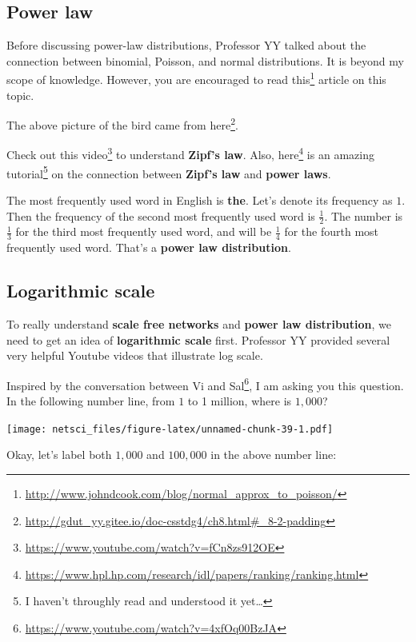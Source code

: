 \documentclass[
]{krantz}
\makeatletter
\renewcommand{\href}[2]{#2\footnote{\url{#1}}}
\newenvironment{kframe}{%
\medskip{}
\setlength{\fboxsep}{.8em}
 \def\at@end@of@kframe{}%
 \ifinner\ifhmode%
  \def\at@end@of@kframe{\end{minipage}}%
  \begin{minipage}{\columnwidth}%
 \fi\fi%
 \def\FrameCommand##1{\hskip\@totalleftmargin \hskip-\fboxsep
 \colorbox{shadecolor}{##1}\hskip-\fboxsep
     \hskip-\linewidth \hskip-\@totalleftmargin \hskip\columnwidth}%
 \MakeFramed {\advance\hsize-\width
   \@totalleftmargin\z@ \linewidth\hsize
   \@setminipage}}%
 {\par\unskip\endMakeFramed%
 \at@end@of@kframe}
\newenvironment{rmdblock}[1]
  {
  \begin{itemize}
  \renewcommand{\labelitemi}{
    \raisebox{-.7\height}[0pt][0pt]{
      {\setkeys{Gin}{width=3em,keepaspectratio}\texttt{[image: images/\#1]}}
    }
  }
  \setlength{\fboxsep}{1em}
  \begin{kframe}
  \item
  }
  {
  \end{kframe}
  \end{itemize}
  }
\newenvironment{rmdreminder}
  {\begin{rmdblock}{reminder}}
  {\end{rmdblock}}
\makeatother
\begin{document}
\hypertarget{power-law}{%
\subsection{Power law}\label{power-law}}

\begin{rmdreminder}
Before discussing power-law distributions, Professor YY talked about the connection between binomial, Poisson, and normal distributions. It is beyond my scope of knowledge. However, you are encouraged to read \href{http://www.johndcook.com/blog/normal_approx_to_poisson/}{this} article on this topic.
\end{rmdreminder}

The above picture of the bird came from \href{http://gdut_yy.gitee.io/doc-csstdg4/ch8.html\#_8-2-padding}{here}.

Check out \href{https://www.youtube.com/watch?v=fCn8zs912OE}{this video} to understand \textbf{Zipf's law}. Also, \href{https://www.hpl.hp.com/research/idl/papers/ranking/ranking.html}{here} is an amazing tutorial\footnote{I haven't throughly read and understood it yet\ldots{}} on the connection between \textbf{Zipf's law} and \textbf{power laws}.

The most frequently used word in English is \textbf{the}. Let's denote its frequency as \(1\). Then the frequency of the second most frequently used word is \(\frac{1}{2}\). The number is \(\frac{1}{3}\) for the third most frequently used word, and will be \(\frac{1}{4}\) for the fourth most frequently used word. That's a \textbf{power law distribution}.

\hypertarget{logarithmic-scale}{%
\subsection{Logarithmic scale}\label{logarithmic-scale}}

To really understand \textbf{scale free networks} and \textbf{power law distribution}, we need to get an idea of \textbf{logarithmic scale} first. Professor YY provided several very helpful Youtube videos that illustrate log scale.

Inspired by \href{https://www.youtube.com/watch?v=4xfOq00BzJA}{the conversation between Vi and Sal}, I am asking you this question. In the following number line, from \(1\) to 1 million, where is \(1,000\)?

\texttt{[image: netsci\_files/figure-latex/unnamed-chunk-39-1.pdf]}

Okay, let's label both \(1,000\) and \(100,000\) in the above number line:
\end{document}
